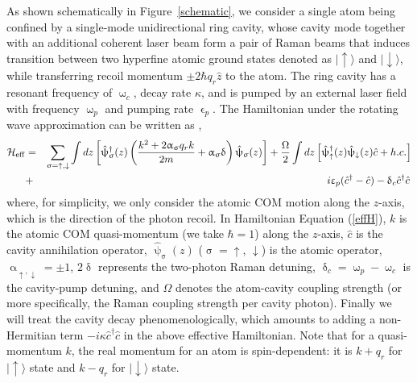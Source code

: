 \documentclass[atoms,article,accept,moreauthors,pdftex,12pt,a4paper]{mdpi}
\def\ba{\begin{eqnarray}}
\def\ea{\end{eqnarray}}
\begin{document}
As shown schematically in Figure~\ref{schematic}, we consider a single atom being confined by a single-mode unidirectional ring cavity, whose cavity mode together with an additional coherent laser beam form a pair of Raman beams that induces transition between two hyperfine atomic ground states denoted as $|\uparrow\rangle$ and $|\downarrow\rangle$, while transferring recoil momentum $\pm 2\hbar q_r\hat{z}$ to the atom. The ring cavity has a resonant frequency of $\upomega_c$, decay rate $\kappa$, and is pumped by an external laser field with frequency $\upomega_p$ and pumping rate $\upvarepsilon_p$.
The Hamiltonian under the rotating wave approximation can be written as \cite{cavitySOC},
\ba
 \mathcal{H}_{\rm eff}& = & \sum_{\upsigma=\uparrow,\downarrow} \int d{z}\left[ \hat{\uppsi}^\dagger_\upsigma({z})\left(\frac{ { k}^2+ 2\upalpha_\upsigma q_r {k}}{2m}+\upalpha_\upsigma \updelta\right)\hat{\uppsi}_\upsigma(z)\right]+  \frac{\Omega}{2}\int d{z}\left[\hat{\uppsi}_{\uparrow}^{\dagger}({z})\hat{\uppsi}_{\downarrow}({z}) \hat{c}+ h.c. \right]\nonumber \\
 & + & i\upvarepsilon_{p}(\hat{c}^{\dagger}-\hat{c})-\updelta_c \hat{c}^{\dagger}\hat{c} \, \label{effH}
 \ea
where, for simplicity, we only consider the atomic COM motion along the $z$-axis, which is the direction of the photon recoil. In Hamiltonian Equation (\ref{effH}), $k$ is the atomic COM quasi-momentum (we take $\hbar =1$) along the $z$-axis, $\hat{c}$ is the cavity annihilation operator, $\hat{\uppsi}_\upsigma(z)$ ($\upsigma = \uparrow$, $\downarrow$) is the atomic operator, $\upalpha_{\uparrow, \downarrow}=\pm 1$, $2\updelta$ represents the two-photon Raman detuning, $\updelta_c=\upomega_p-\upomega_c$ is the cavity-pump detuning, and $\Omega$ denotes the atom-cavity coupling strength (or more specifically, the Raman coupling strength per cavity photon). Finally we will treat the cavity decay phenomenologically, which amounts to adding a non-Hermitian term $-i\kappa \hat{c}^{\dagger}\hat{c}$ in the above effective Hamiltonian. Note that for a quasi-momentum $k$, the real momentum for an atom is spin-dependent: it is $k+q_r$ for $|\uparrow \rangle$ state and $k-q_r$ for $|\downarrow \rangle$ state.
\end{document}
